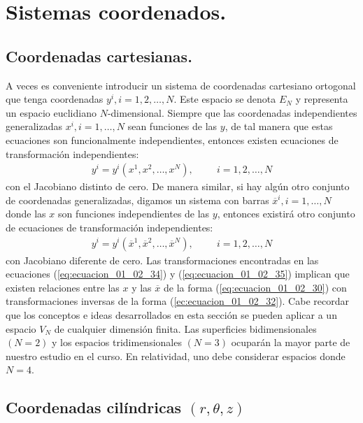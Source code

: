 \documentclass[hidelinks,12pt]{article}
\begin{document}
\section{Sistemas coordenados.}

\subsection{Coordenadas cartesianas.}

A veces es conveniente introducir un sistema de coordenadas cartesiano ortogonal que tenga coordenadas $y^{i}, i = 1, 2, \ldots, N$. Este espacio se denota $E_{N}$ y representa un espacio euclidiano $N$-dimensional. Siempre que las coordenadas independientes generalizadas $x^{i}, i = 1, \ldots, N$ sean funciones de las $y$, de tal manera que estas ecuaciones son funcionalmente independientes, entonces existen ecuaciones de transformación independientes:
\begin{align}
y^{i} = y^{i} (x^{1}, x^{2}, \ldots, x^{N}), \hspace{1cm} i = 1, 2, \ldots, N
\label{eq:ecuacion_01_02_34}
\end{align}
con el Jacobiano distinto de cero. De manera similar, si hay algún otro conjunto de coordenadas generalizadas, digamos un sistema con barras $\overline{x}^{i}, i = 1, \ldots, N$ donde las $x$ son funciones independientes de las $y$, entonces existirá otro conjunto de ecuaciones de transformación independientes:
\begin{align}
y^{i} = y^{i} (\overline{x}^{1}, \overline{x}^{2}, \ldots, \overline{x}^{N}), \hspace{1cm} i = 1, 2, \ldots, N
\label{eq:ecuacion_01_02_35}
\end{align}
con Jacobiano diferente de cero. Las transformaciones encontradas en las ecuaciones (\ref{eq:ecuacion_01_02_34}) y (\ref{eq:ecuacion_01_02_35}) implican que existen relaciones entre las $x$ y las $\overline{x}$ de la forma (\ref{eq:ecuacion_01_02_30}) con transformaciones inversas de la forma (\ref{ec:ecuacion_01_02_32}). Cabe recordar que los conceptos e ideas desarrollados en esta sección se pueden aplicar a un espacio $V_{N}$ de cualquier dimensión finita. Las superficies bidimensionales $(N = 2)$ y los espacios tridimensionales $(N = 3)$ ocuparán la mayor parte de nuestro estudio en el curso. En relatividad, uno debe considerar espacios donde $N = 4$.

\subsection{Coordenadas cilíndricas \texorpdfstring{$(r, \theta, z)$}{(r, q, z)}}
\end{document}
